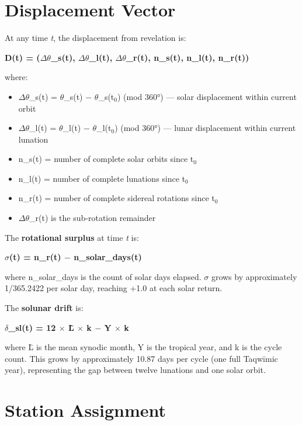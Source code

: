 \hypertarget{displacement-vector}{%
\section{Displacement Vector}\label{displacement-vector}}

At any time \emph{t}, the displacement from revelation is:

\textbf{D(t) = (\(\Delta\)\(\theta\)\_s(t), \(\Delta\)\(\theta\)\_l(t), \(\Delta\)\(\theta\)\_r(t), n\_s(t), n\_l(t), n\_r(t))}

where:

\begin{itemize}
\tightlist
\item
  \(\Delta\)\(\theta\)\_s(t) = \(\theta\)\_s(t) \(-\) \(\theta\)\_s(t\(_0\)) (mod 360°) --- solar displacement within current orbit
\item
  \(\Delta\)\(\theta\)\_l(t) = \(\theta\)\_l(t) \(-\) \(\theta\)\_l(t\(_0\)) (mod 360°) --- lunar displacement within current lunation
\item
  n\_s(t) = number of complete solar orbits since t\(_0\)
\item
  n\_l(t) = number of complete lunations since t\(_0\)
\item
  n\_r(t) = number of complete sidereal rotations since t\(_0\)
\item
  \(\Delta\)\(\theta\)\_r(t) is the sub-rotation remainder
\end{itemize}

The \textbf{rotational surplus} at time \emph{t} is:

\textbf{\(\sigma\)(t) = n\_r(t) \(-\) n\_solar\_days(t)}

where n\_solar\_days is the count of solar days elapsed. \(\sigma\) grows by approximately 1/365.2422 per solar day, reaching +1.0 at each solar return.

The \textbf{solunar drift} is:

\textbf{\(\delta\)\_sl(t) = 12 \(\times\) L̄ \(\times\) k \(-\) Y \(\times\) k}

where L̄ is the mean synodic month, Y is the tropical year, and k is the cycle count. This grows by approximately 10.87 days per cycle (one full Taqwīmic year), representing the gap between twelve lunations and one solar orbit.

\hypertarget{station-assignment}{%
\section{Station Assignment}\label{station-assignment}}

